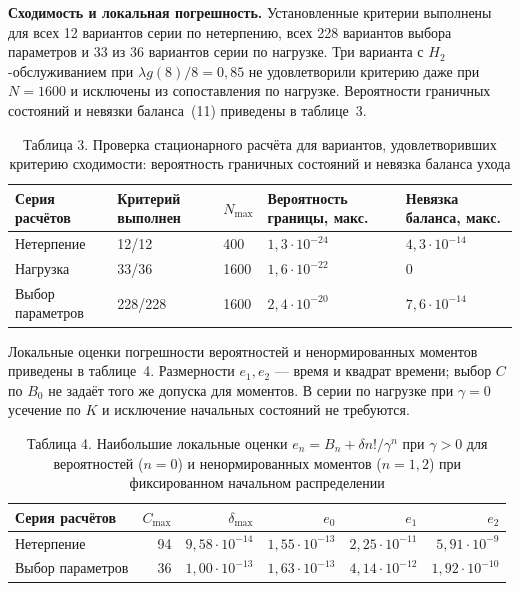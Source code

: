 \noindent\textbf{Сходимость и локальная погрешность.}
Установленные критерии выполнены для всех 12 вариантов серии по нетерпению, всех 228 вариантов выбора параметров и 33 из 36 вариантов серии по нагрузке. Три варианта с $H_2$-обслуживанием при $\lambda g(8)/8=0{,}85$ не удовлетворили критерию даже при $N=1600$ и исключены из сопоставления по нагрузке. Вероятности граничных состояний и невязки баланса~(11) приведены в таблице~3.

\begin{table}[htbp]\centering\small
\caption{Таблица 3. Проверка стационарного расчёта для вариантов, удовлетворивших критерию сходимости: вероятность граничных состояний и невязка баланса ухода}
\begin{tabular}{p{.20\linewidth}p{.14\linewidth}p{.10\linewidth}p{.19\linewidth}p{.23\linewidth}}
\hline
Серия расчётов & Критерий выполнен & $N_{\max}$ & Вероятность границы, макс. & Невязка баланса, макс. \\
\hline
Нетерпение & 12/12 & 400 & $1{,}3\cdot10^{-24}$ & $4{,}3\cdot10^{-14}$ \\
Нагрузка & 33/36 & 1600 & $1{,}6\cdot10^{-22}$ & $0$ \\
Выбор параметров & 228/228 & 1600 & $2{,}4\cdot10^{-20}$ & $7{,}6\cdot10^{-14}$ \\
\hline
\end{tabular}

\end{table}

Локальные оценки погрешности вероятностей и ненормированных моментов приведены в таблице~4. Размерности $e_1,e_2$ --- время и квадрат времени; выбор $C$ по $B_0$ не задаёт того же допуска для моментов. В серии по нагрузке при $\gamma=0$ усечение по $K$ и исключение начальных состояний не требуются.

\begin{table}[htbp]\centering\small
\caption{Таблица 4. Наибольшие локальные оценки $e_n=B_n+\delta n!/\gamma^n$ при $\gamma>0$ для вероятностей ($n=0$) и ненормированных моментов ($n=1,2$) при фиксированном начальном распределении}
\begin{tabular}{lrrrrr}
\hline
Серия расчётов & $C_{\max}$ & $\delta_{\max}$ & $e_0$ & $e_1$ & $e_2$ \\
\hline
Нетерпение & 94 & $9{,}58\cdot10^{-14}$ & $1{,}55\cdot10^{-13}$ & $2{,}25\cdot10^{-11}$ & $5{,}91\cdot10^{-9}$ \\
Выбор параметров & 36 & $1{,}00\cdot10^{-13}$ & $1{,}63\cdot10^{-13}$ & $4{,}14\cdot10^{-12}$ & $1{,}92\cdot10^{-10}$ \\
\hline
\end{tabular}

\end{table}

